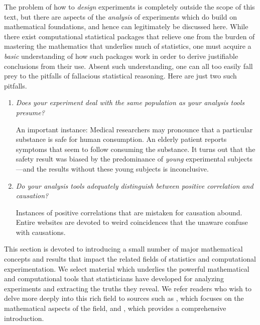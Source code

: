 The problem of how to {\em design} experiments is completely outside the scope of this text, but there are aspects of the {\em analysis} of experiments which do build on mathematical foundations, and hence can legitimately be discussed here.  While there exist computational
statistical packages that relieve one from the burden of mastering the mathematics that underlies much of statistics, one must acquire a {\em basic} understanding of how such packages work in order to derive justifiable conclusions from their use.  Absent such understanding, one can all too easily fall prey to the pitfalls of fallacious statistical reasoning.  Here are just two such pitfalls.
\begin{enumerate}
\item
{\em Does your experiment deal with the same population as your analysis tools presume?} 

\smallskip

An important instance: Medical researchers may pronounce that a particular substance is safe for human consumption.  An elderly patient reports symptoms that seem to follow consuming the substance.  It turns out that the safety result was biased by the predominance of {\em young} experimental subjects---and the results without these young subjects is inconclusive.

\medskip\item
{\em Do your analysis tools adequately distinguish between {\em positive correlation} and {\em causation}?}

\smallskip

Instances of positive correlations that are mistaken for causation abound.  Entire websites are devoted to weird coincidences that the unaware confuse with causations.
\end{enumerate}

This section is devoted to introducing a small number of major mathematical concepts and results that impact the related fields of statistics and computational experimentation.  We select material which underlies the powerful mathematical and computational tools that statisticians have developed for analyzing experiments and extracting the truths they reveal.  We refer readers who wish to delve more deeply into this rich field to sources such as \cite{Hoel58}, which focuses on the mathematical aspects of the field, and \cite{Bremaud17}, which provides a comprehensive introduction.

\bigskip

